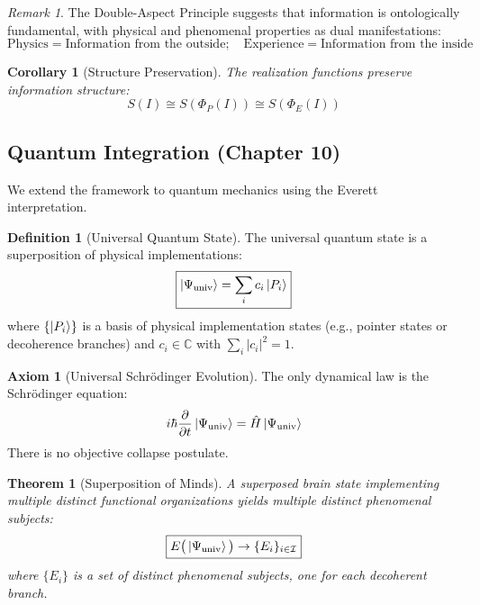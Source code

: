 \documentclass[11pt,a4paper]{article}
\theoremstyle{definition}
\newtheorem{definition}{Definition}[section]
\newtheorem{axiom}{Axiom}[section]
\theoremstyle{plain}
\newtheorem{theorem}{Theorem}[section]
\newtheorem{corollary}{Corollary}[section]
\theoremstyle{remark}
\newtheorem{remark}{Remark}[section]
\newcommand{\PhiP}{\Phi_{P}}
\newcommand{\PhiE}{\Phi_{E}}
\newcommand{\Psiuniv}{\Psi_{\text{univ}}}
\begin{document}
\begin{remark}
The Double-Aspect Principle suggests that information is ontologically fundamental, with physical and phenomenal properties as dual manifestations:
\begin{equation}
\text{Physics} = \text{Information from the outside}; \quad \text{Experience} = \text{Information from the inside}
\end{equation}
\end{remark}

\begin{corollary}[Structure Preservation]
The realization functions preserve information structure:
\begin{equation}
S(I) \cong S(\PhiP(I)) \cong S(\PhiE(I))
\end{equation}
\end{corollary}

\subsection{Quantum Integration (Chapter 10)}

We extend the framework to quantum mechanics using the Everett interpretation.

\begin{definition}[Universal Quantum State]
The universal quantum state is a superposition of physical implementations:
\begin{equation}
\boxed{\ket{\Psiuniv} = \sum_{i} c_i \ket{P_i}}
\end{equation}
where $\{ \ket{P_i} \}$ is a basis of physical implementation states (e.g., pointer states or decoherence branches) and $c_i \in \mathbb{C}$ with $\sum_i |c_i|^2 = 1$.
\end{definition}

\begin{axiom}[Universal Schr\"odinger Evolution]
The only dynamical law is the Schr\"odinger equation:
\begin{equation}
i\hbar \frac{\partial}{\partial t} \ket{\Psiuniv} = \hat{H} \ket{\Psiuniv}
\end{equation}
There is no objective collapse postulate.
\end{axiom}

\begin{theorem}[Superposition of Minds]\label{thm:superposition_minds}
A superposed brain state implementing multiple distinct functional organizations yields multiple distinct phenomenal subjects:
\begin{equation}
\boxed{E\big( \ket{\Psiuniv} \big) \to \{ E_i \}_{i \in \mathcal{I}}}
\end{equation}
where $\{ E_i \}$ is a set of distinct phenomenal subjects, one for each decoherent branch.
\end{theorem}
\end{document}
